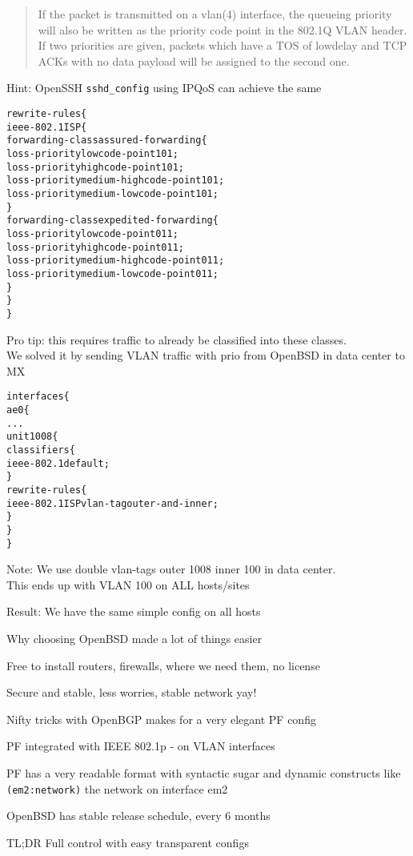 \documentclass[Screen16to9,17pt]{foils}
\begin{document}
\begin{quote}
If the packet is transmitted on a vlan(4) interface, the queueing priority will also be written as
the priority code point in the 802.1Q VLAN header.  If two
priorities are given, packets which have a TOS of lowdelay and
TCP ACKs with no data payload will be assigned to the second one.
\end{quote}

Hint: OpenSSH \verb+sshd_config+ using IPQoS can achieve the same


\begin{alltt}\footnotesize
rewrite-rules \{
    ieee-802.1 ISP \{
        forwarding-class assured-forwarding \{
            loss-priority low code-point 101;
            loss-priority high code-point 101;
            loss-priority medium-high code-point 101;
            loss-priority medium-low code-point 101;
        \}
        forwarding-class expedited-forwarding \{
            loss-priority low code-point 011;
            loss-priority high code-point 011;
            loss-priority medium-high code-point 011;
            loss-priority medium-low code-point 011;
        \}
    \}
\}
\end{alltt}

Pro tip: this requires traffic to already be classified into these classes.\\
We solved it by sending VLAN traffic with prio from OpenBSD in data center to MX


\begin{alltt}\small
interfaces \{
    ae0 \{
        ...
        unit 1008 \{
            classifiers \{
                ieee-802.1 default;
            \}
            rewrite-rules \{
                ieee-802.1 ISP vlan-tag outer-and-inner;
            \}
        \}
\}
\end{alltt}

Note: We use double vlan-tags outer 1008 inner 100 in data center.\\
This ends up with VLAN 100 on ALL hosts/sites

Result: We have the same simple config on all hosts


Why choosing OpenBSD made a lot of things easier

\begin{list2}
\item Free to install routers, firewalls, where we need them, no license
\item Secure and stable, less worries, stable network yay!
\item Nifty tricks with OpenBGP makes for a very elegant PF config
\item PF integrated with IEEE 802.1p - on VLAN interfaces
\item PF has a very readable format with syntactic sugar and dynamic constructs like \verb+(em2:network)+ the network on interface em2
\item OpenBSD has stable release schedule, every 6 months
\end{list2}

TL;DR Full control with easy transparent configs
\end{document}
